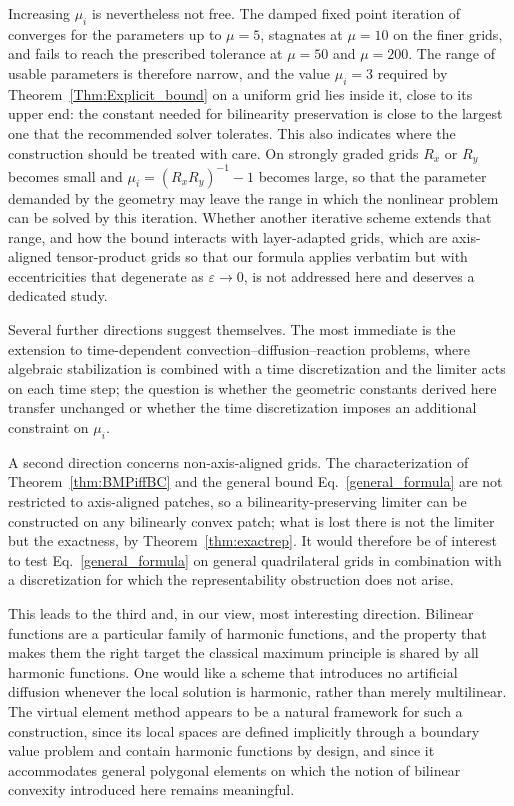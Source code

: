 \documentclass[a4paper]{article}
\theoremstyle{plain}
\theoremstyle{definition}
\theoremstyle{remark}
\begin{document}
Increasing $\mu_i$ is nevertheless not free. The damped fixed point iteration of
\cite{JJ19} converges for the parameters up to $\mu = 5$, stagnates at
$\mu = 10$ on the finer grids, and fails to reach the prescribed tolerance at
$\mu = 50$ and $\mu = 200$. The range of usable parameters is therefore narrow, and
the value $\mu_i = 3$ required by Theorem~\ref{Thm:Explicit_bound} on a uniform
grid lies inside it, close to its upper end: the constant needed for bilinearity
preservation is close to the largest one that the recommended solver tolerates.
This also indicates where the construction should be treated with care. On strongly
graded grids $R_x$ or $R_y$ becomes small and $\mu_i = (R_xR_y)^{-1} - 1$ becomes
large, so that the parameter demanded by the geometry may leave the range in which
the nonlinear problem can be solved by this iteration. Whether another iterative
scheme extends that range, and how the bound interacts with layer-adapted grids,
which are axis-aligned tensor-product grids so that our formula applies verbatim
but with eccentricities that degenerate as $\varepsilon \to 0$, is not addressed
here and deserves a dedicated study.

Several further directions suggest themselves. The most immediate is the extension to
time-dependent convection--diffusion--reaction problems, where algebraic stabilization
is combined with a time discretization and the limiter acts on each time step; the
question is whether the geometric constants derived here transfer unchanged or whether
the time discretization imposes an additional constraint on $\mu_i$.

A second direction concerns non-axis-aligned grids. The characterization of
Theorem~\ref{thm:BMPiffBC} and the general bound Eq.~\eqref{general_formula} are not
restricted to axis-aligned patches, so a bilinearity-preserving limiter can be
constructed on any bilinearly convex patch; what is lost there is not the limiter but
the exactness, by Theorem~\ref{thm:exactrep}. It would therefore be of interest to test
Eq.~\eqref{general_formula} on general quadrilateral grids in combination with a
discretization for which the representability obstruction does not arise.

This leads to the third and, in our view, most interesting direction. Bilinear
functions are a particular family of harmonic functions, and the property that makes
them the right target the classical maximum principle is shared by all harmonic
functions. One would like a scheme that introduces no artificial diffusion whenever the
local solution is harmonic, rather than merely multilinear. The virtual element method \cite{VEM}
appears to be a natural framework for such a construction, since its local spaces are
defined implicitly through a boundary value problem and contain harmonic functions by
design, and since it accommodates general polygonal elements on which the notion of
bilinear convexity introduced here remains meaningful.
\end{document}
